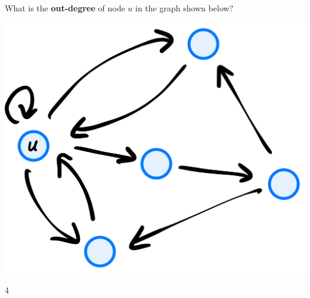 \begin{prob}
    What is the \textbf{out-degree} of node $u$ in the graph shown below?

    \includegraphics[width=.4\textwidth]{./g1.png}

    \begin{soln}
        4
    \end{soln}

\end{prob}
